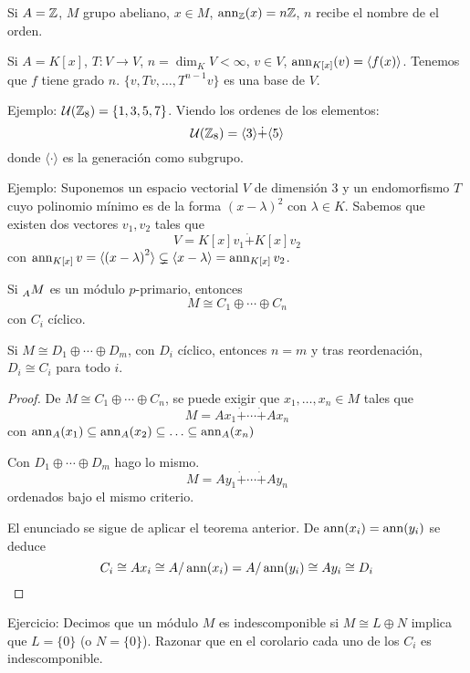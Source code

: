 \begin{obs}
  Si \(A=\mathbb{Z}\), \(M\) grupo abeliano, \(x\in M\),
  \(\operatorname{ann}_{\mathbb{Z}}(x)=n\mathbb{Z}\), \(n\) recibe el nombre de el orden.
\end{obs}

\begin{obs}
  Si \(A=K[x]\), \(T:V\longrightarrow V\), \(n=\dim_K V<\infty\),
  \(v\in V\), \(\operatorname{ann}_{K[x]}(v)=\langle f(x)\rangle\).
  Tenemos que \(f\) tiene grado \(n\). \(\{v, Tv,\ldots, T^{n-1}v\}\)
  es una base de \(V\).
\end{obs}

Ejemplo: \(\mathcal{U}(\mathbb{Z}_8)=\{1,3,5,7\}\).
Viendo los ordenes de los elementos:
\[\mathcal{U}(\mathbb{Z}_8)=\langle 3\rangle\dot{+}\langle 5\rangle\]
donde \(\langle \cdot\rangle\) es la generación como subgrupo.

Ejemplo: Suponemos un espacio vectorial \(V\) de dimensión 3 y un
endomorfismo \(T\) cuyo polinomio mínimo es de la forma
\({(x-\lambda)}^2\) con \(\lambda\in K\).
Sabemos que existen dos vectores \(v_1,v_2\) tales que
\[
  V=K[x]v_1\dot{+} K[x]v_2
\]
con \(\operatorname{ann}_{K[x]} v=\langle {(x-\lambda)}^2\rangle
\subsetneq\langle {x-\lambda}\rangle=\operatorname{ann}_{K[x]} v_2\).

\begin{cor}
  Si \(\prescript{}{A}{M}\) es un módulo \(p\)-primario, entonces
  \[
    M\cong C_1\oplus\cdots\oplus C_n
  \]
  con \(C_i\) cíclico.

  Si \(M\cong D_1\oplus\cdots\oplus D_m\), con \(D_i\) cíclico, entonces
  \(n=m\) y tras reordenación, \(D_i\cong C_i\) para todo \(i\).
\end{cor}
\begin{proof}
  De \(M\cong C_1\oplus\cdots\oplus C_n\), se puede exigir que
  \(x_1,\ldots,x_n\in M\) tales que
  \[
    M=Ax_1\dot{+}\cdots\dot{+}Ax_n
  \]
  con \(\operatorname{ann}_A(x_1)\subseteq\operatorname{ann}_A(x_2)\subseteq\ldots\subseteq\operatorname{ann}_A(x_n)\)

  Con \(D_1\oplus\cdots\oplus D_m\) hago lo mismo.
  \[
    M=Ay_1\dot{+}\cdots\dot{+}Ay_n
  \]
  ordenados bajo el mismo criterio.

  El enunciado se sigue de aplicar el teorema anterior. De
  \(\operatorname{ann}(x_i)=\operatorname{ann}(y_i)\) se deduce
  \[
    C_i\cong Ax_i\cong A/\operatorname{ann}(x_i)=A/\operatorname{ann}(y_i)\cong Ay_i\cong D_i
  \]
\end{proof}

Ejercicio: Decimos que un módulo \(M\) es indescomponible si \(M\cong
L\oplus N\) implica que \(L=\{0\}\) (o \(N=\{0\}\)).
Razonar que en el corolario cada uno de los \(C_i\) es indescomponible.

